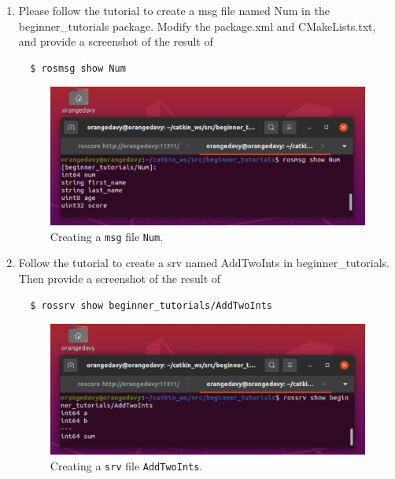 \documentclass[12pt]{article}
\begin{document}
\begin{enumerate}
    \item Please follow the tutorial to create a msg file named Num in the beginner\_tutorials package. Modify the package.xml and CMakeLists.txt, and provide a screenshot of the result of 
\begin{verbatim}
  $ rosmsg show Num
\end{verbatim}

\begin{figure}[H]
  \centering\includegraphics[width=14cm]{images/rosmsg_show_num.png}\vspace{-10pt}
  \caption{Creating a \texttt{msg} file \texttt{Num}.}\label{fig:rosmsg_show_num}
  \end{figure}

    \item Follow the tutorial to create a srv named AddTwoInts in beginner\_tutorials. Then provide a screenshot of the result of 
\begin{verbatim}
  $ rossrv show beginner_tutorials/AddTwoInts
\end{verbatim} 

\begin{figure}[H]
  \centering\includegraphics[width=14cm]{images/rossrv_show_ATI.png}\vspace{-10pt}
  \caption{Creating a \texttt{srv} file \texttt{AddTwoInts}.}\label{fig:rossrv_show_ATI}
  \end{figure}

\end{enumerate}
\end{document}
